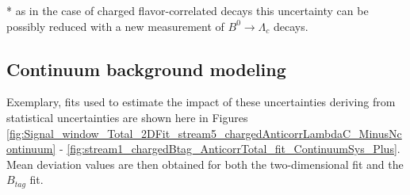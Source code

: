 \begin{table}[h]
\centering
{}%
\caption{Systematic uncertainties in the determination of the  $B^- \rightarrow \bar{\Lambda}_c^- X$ branching fractions in \si{\percent}.}
\label{tab:systematics_ChargedAnticorr}
\end{table}


* as in the case of charged flavor-correlated decays this uncertainty can be possibly reduced with a new measurement of $B^0 \rightarrow \Lambda_c$ decays.


\subsection{Continuum background modeling}

Exemplary, fits used to estimate the impact of these uncertainties deriving from statistical uncertainties are shown here in Figures \ref{fig:Signal_window_Total_2DFit_stream5_chargedAnticorrLambdaC_MinusNcontinuum} - \ref{fig:stream1_chargedBtag_AnticorrTotal_fit_ContinuumSys_Plus}.
Mean deviation values are then obtained for both the two-dimensional fit and the $B_{tag}$ fit.

